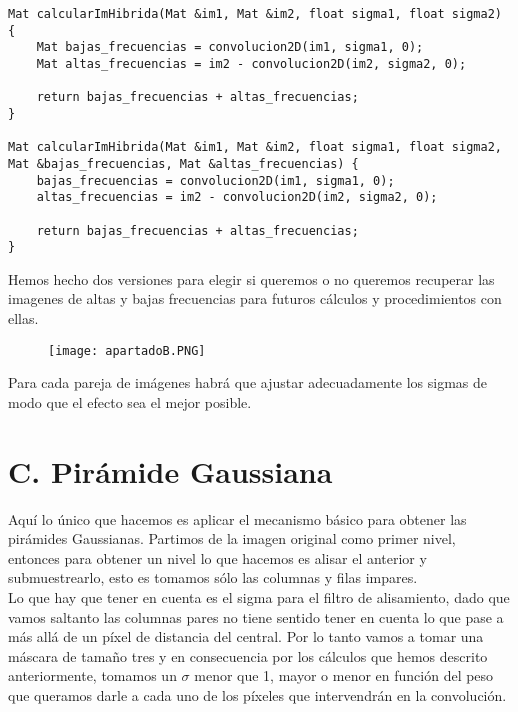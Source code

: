 \documentclass[10pt,a4paper]{article}
\begin{document}
\begin{lstlisting}
Mat calcularImHibrida(Mat &im1, Mat &im2, float sigma1, float sigma2) {
	Mat bajas_frecuencias = convolucion2D(im1, sigma1, 0);
	Mat altas_frecuencias = im2 - convolucion2D(im2, sigma2, 0);

	return bajas_frecuencias + altas_frecuencias;
}

Mat calcularImHibrida(Mat &im1, Mat &im2, float sigma1, float sigma2, Mat &bajas_frecuencias, Mat &altas_frecuencias) {
	bajas_frecuencias = convolucion2D(im1, sigma1, 0);
	altas_frecuencias = im2 - convolucion2D(im2, sigma2, 0);

	return bajas_frecuencias + altas_frecuencias;
}
\end{lstlisting}

Hemos hecho dos versiones para elegir si queremos o no queremos recuperar las imagenes de altas y bajas frecuencias para futuros cálculos y procedimientos con ellas.\\

\begin{figure}[H]
\centering
\texttt{[image: apartadoB.PNG]}
\end{figure}

Para cada pareja de imágenes habrá que ajustar adecuadamente los sigmas de modo que el efecto sea el mejor posible.\\

\section*{C. Pirámide Gaussiana}

Aquí lo único que hacemos es aplicar el mecanismo básico para obtener las pirámides Gaussianas. Partimos de la imagen original como primer nivel, entonces para obtener un nivel lo que hacemos es alisar el anterior y submuestrearlo, esto es tomamos sólo las columnas y filas impares.\\

Lo que hay que tener en cuenta es el sigma para el filtro de alisamiento, dado que vamos saltanto las columnas pares no tiene sentido tener en cuenta lo que pase a más allá de un píxel de distancia del central. Por lo tanto vamos a tomar una máscara de tamaño tres y en consecuencia por los cálculos que hemos descrito anteriormente, tomamos un $\sigma$ menor que 1, mayor o menor en función del peso que queramos darle a cada uno de los píxeles que intervendrán en la convolución.\\
\end{document}
